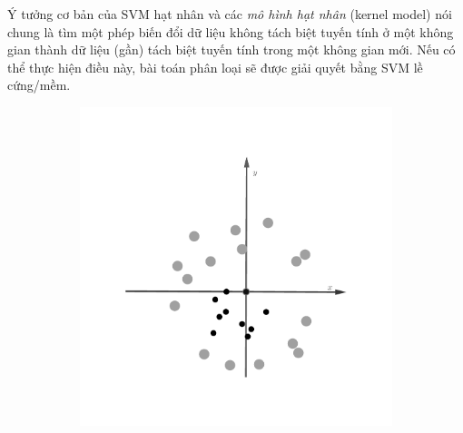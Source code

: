 Ý tưởng cơ bản của SVM hạt nhân và các \textit{mô hình hạt nhân} (kernel model) nói chung là tìm một phép biến đổi dữ liệu không tách biệt tuyến tính ở một không gian thành dữ liệu (gần) tách biệt tuyến tính trong một không gian mới. Nếu có thể thực hiện điều này, bài toán phân loại sẽ
được giải quyết bằng SVM lề cứng/mềm.



\begin{figure}[t]
    \begin{subfigure}{0.325\textwidth}
    \includegraphics[width=\linewidth]{Chapters/09_SupportVectorMachines/21_kernelsvm/42_gray.png} %
    \caption{}
    \end{subfigure}
    \begin{subfigure}{0.325\textwidth}

\end{subfigure}
\end{figure}
